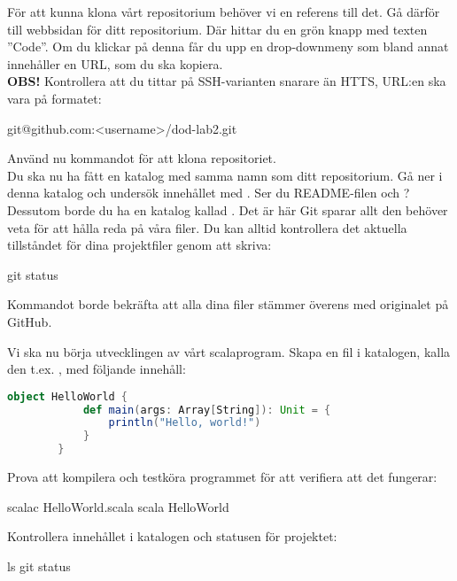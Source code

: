 \begin{Datorarbete}
	För att kunna klona vårt repositorium behöver vi en referens till det. Gå därför till webbsidan för ditt repositorium. Där hittar du en grön knapp med texten ''Code''. Om du klickar på denna får du upp en drop-downmeny som bland annat innehåller en URL, som du ska kopiera.
	\\
	
	
	\textbf{OBS!} Kontrollera att du tittar på SSH-varianten snarare än HTTS, URL:en ska vara på formatet:
	\vspace{-.5em}
	\begin{Code}
		git@github.com:<username>/dod-lab2.git
	\end{Code}
	\vspace{.5em}

	\code{[\ref{git-clone}]} Använd nu kommandot  för att klona repositoriet.
	\\

	Du ska nu ha fått en katalog med samma namn som ditt repositorium. Gå ner i denna katalog och undersök innehållet med . Ser du README-filen och ? Dessutom borde du ha en katalog kallad . Det är här Git sparar allt den behöver veta för att hålla reda på våra filer.
	Du kan alltid kontrollera det aktuella tillståndet för dina projektfiler genom att skriva:

	\begin{Code}
		git status
	\end{Code}

	Kommandot borde bekräfta att alla dina filer stämmer överens med originalet på GitHub.

	\item Vi ska nu börja utvecklingen av vårt scalaprogram. Skapa en fil i katalogen, kalla den t.ex. , med följande innehåll:

	\begin{lstlisting}[language=scala]
		object HelloWorld {
			def main(args: Array[String]): Unit = {
				println("Hello, world!")
			}
		}
	\end{lstlisting}

	Prova att kompilera och testköra programmet för att verifiera att det fungerar:

	\begin{Code}
		scalac HelloWorld.scala
		scala HelloWorld
	\end{Code}

	Kontrollera innehållet i katalogen och statusen för projektet:

	\begin{Code}
		ls
		git status
	\end{Code}


\end{Datorarbete}
